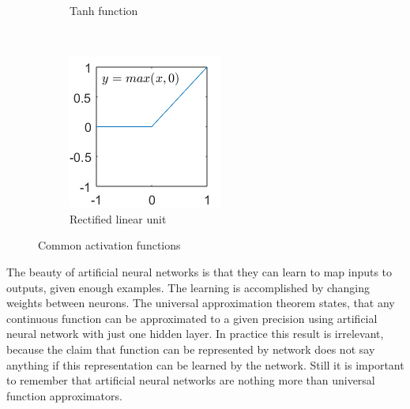 \documentclass[a4paper,11pt]{article}
\begin{document}
\begin{figure}[h]
\begin{subfigure}[b]{0.3\textwidth}
                \caption{Tanh function}
                \label{fig:tanh}
        \end{subfigure}
        ~ %
        \begin{subfigure}[b]{0.3\textwidth}
                \includegraphics[width=\textwidth]{relu.png}
                \caption{Rectified linear unit}
                \label{fig:relu}
        \end{subfigure}
        \caption{Common activation functions}\label{fig:activation_functions}
\end{figure}


The beauty of artificial neural networks is that they can learn to map inputs to outputs, given enough examples. The learning is accomplished by changing weights between neurons. The universal approximation theorem states, that any continuous function can be approximated to a given precision using artificial neural network with just one hidden layer. In practice this result is irrelevant, because the claim that function can be represented by network does not say anything if this representation can be learned by the network. Still it is important to remember that artificial neural networks are nothing more than universal function approximators.
\end{document}
